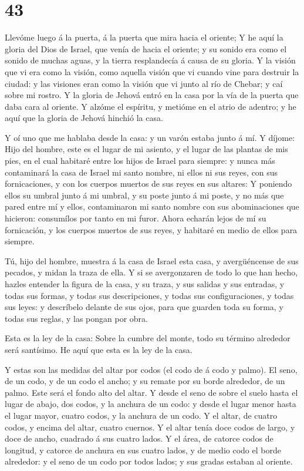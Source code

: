 \hypertarget{section-42}{%
\section{43}\label{section-42}}

 Llevóme luego á la puerta, á la puerta que mira hacia el
oriente;  Y he aquí la gloria del Dios de Israel, que venía
de hacia el oriente; y su sonido era como el sonido de muchas aguas, y
la tierra resplandecía á causa de su gloria.  Y la visión
que vi era como la visión, como aquella visión que vi cuando vine para
destruir la ciudad: y las visiones eran como la visión que vi junto al
río de Chebar; y caí sobre mi rostro.  Y la gloria de Jehová
entró en la casa por la vía de la puerta que daba cara al oriente.
 Y alzóme el espíritu, y metióme en el atrio de adentro; y
he aquí que la gloria de Jehová hinchió la casa.

 Y oí uno que me hablaba desde la casa: y un varón estaba
junto á mí.  Y díjome: Hijo del hombre, este es el lugar de
mi asiento, y el lugar de las plantas de mis pies, en el cual habitaré
entre los hijos de Israel para siempre: y nunca más contaminará la casa
de Israel mi santo nombre, ni ellos ni sus reyes, con sus fornicaciones,
y con los cuerpos muertos de sus reyes en sus altares:  Y
poniendo ellos su umbral junto á mi umbral, y su poste junto á mi poste,
y no más que pared entre mí y ellos, contaminaron mi santo nombre con
sus abominaciones que hicieron: consumílos por tanto en mi furor.
 Ahora echarán lejos de mí su fornicación, y los cuerpos
muertos de sus reyes, y habitaré en medio de ellos para siempre.

 Tú, hijo del hombre, muestra á la casa de Israel esta
casa, y avergüéncense de sus pecados, y midan la traza de ella.
 Y si se avergonzaren de todo lo que han hecho, hazles
entender la figura de la casa, y su traza, y sus salidas y sus entradas,
y todas sus formas, y todas sus descripciones, y todas sus
configuraciones, y todas sus leyes: y descríbelo delante de sus ojos,
para que guarden toda su forma, y todas sus reglas, y las pongan por
obra.

 Esta es la ley de la casa: Sobre la cumbre del monte, todo
su término alrededor será santísimo. He aquí que esta es la ley de la
casa.

 Y estas son las medidas del altar por codos (el codo de á
codo y palmo). El seno, de un codo, y de un codo el ancho; y su remate
por su borde alrededor, de un palmo. Este será el fondo alto del altar.
 Y desde el seno de sobre el suelo hasta el lugar de abajo,
dos codos, y la anchura de un codo: y desde el lugar menor hasta el
lugar mayor, cuatro codos, y la anchura de un codo.  Y el
altar, de cuatro codos, y encima del altar, cuatro cuernos.
 Y el altar tenía doce codos de largo, y doce de ancho,
cuadrado á sus cuatro lados.  Y el área, de catorce codos
de longitud, y catorce de anchura en sus cuatro lados, y de medio codo
el borde alrededor: y el seno de un codo por todos lados; y sus gradas
estaban al oriente.

